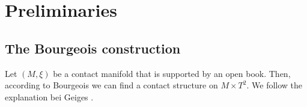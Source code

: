 \section*{Preliminaries}
\subsection*{The Bourgeois construction}
Let $(M, \xi)$ be a contact manifold that is supported by an open book.
Then, according to Bourgeois \cite{Bourgeois02} we can find a contact structure on $M \times T^2$.
We follow the explanation bei Geiges \cite{Geiges08}.